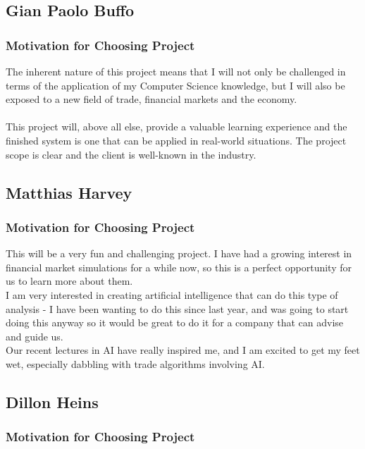 \documentclass{article}
\begin{document}
			
	\cleardoublepage		
		
	\subsection{Gian Paolo Buffo}
		
		\subsubsection{Motivation for Choosing Project}
		The inherent nature of this project means that I will not only be challenged in terms of the application of my Computer Science knowledge, but I will also be exposed to a new field of trade, financial markets and the economy.
\\\\
This project will, above all else, provide a valuable learning experience and the finished system is one that can be applied in real-world situations. The project scope is clear and the client is well-known in the industry. 

	\cleardoublepage

	\subsection{Matthias Harvey}
		
		\subsubsection{Motivation for Choosing Project}
		This will be a very fun and challenging project. I have had a growing interest in financial market simulations for a while now, so this is a perfect opportunity for us to learn more about them.\\
		
		I am very interested in creating artificial intelligence that can do this type of analysis - I have been wanting to do this since last year, and was going to start doing this anyway so it would be great to do it for a company that can advise and guide us.\\

		Our recent lectures in AI have really inspired me, and I am excited to get my feet wet, especially dabbling with trade algorithms involving AI.
	\cleardoublepage
	
	\subsection{Dillon Heins}
		\subsubsection{Motivation for Choosing Project}
\end{document}
